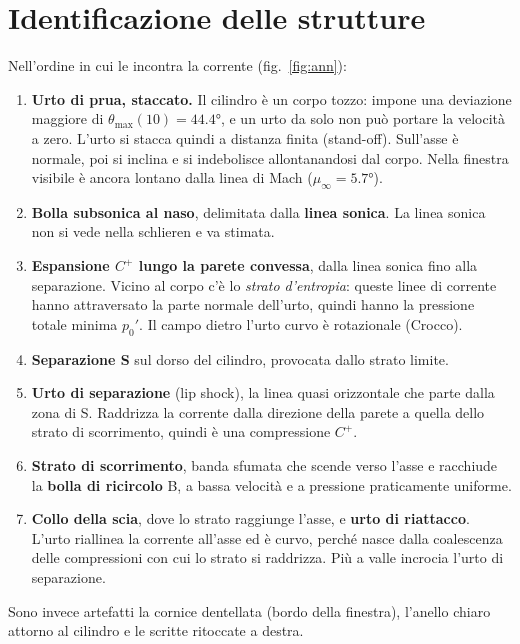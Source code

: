 \documentclass[11pt,a4paper]{article}
\newcommand{\Cp}{C^{+}}
\begin{document}
\section{Identificazione delle strutture}
Nell'ordine in cui le incontra la corrente (fig.~\ref{fig:ann}):
\begin{enumerate}
\item \textbf{Urto di prua, staccato.} Il cilindro è un corpo tozzo: impone una deviazione maggiore di
  $\theta_{\max}(10)=\ang{44.4}$, e un urto da solo non può portare la velocità a zero. L'urto si stacca
  quindi a distanza finita (stand-off). Sull'asse è normale, poi si inclina e si indebolisce allontanandosi
  dal corpo. Nella finestra visibile è ancora lontano dalla linea di Mach ($\mu_\infty=\ang{5.7}$).
\item \textbf{Bolla subsonica al naso}, delimitata dalla \textbf{linea sonica}. La linea sonica non si
  vede nella schlieren e va stimata.
\item \textbf{Espansione $\Cp$ lungo la parete convessa}, dalla linea sonica fino alla separazione.
  Vicino al corpo c'è lo \emph{strato d'entropia}: queste linee di corrente hanno attraversato la parte
  normale dell'urto, quindi hanno la pressione totale minima $p_0'$. Il campo dietro l'urto curvo è rotazionale (Crocco).
\item \textbf{Separazione S} sul dorso del cilindro, provocata dallo strato limite.
\item \textbf{Urto di separazione} (lip shock), la linea quasi orizzontale che parte dalla zona di S.
  Raddrizza la corrente dalla direzione della parete a quella dello strato di scorrimento, quindi è una compressione $\Cp$.
\item \textbf{Strato di scorrimento}, banda sfumata che scende verso l'asse e racchiude la \textbf{bolla di
  ricircolo} B, a bassa velocità e a pressione praticamente uniforme.
\item \textbf{Collo della scia}, dove lo strato raggiunge l'asse, e \textbf{urto di riattacco}. L'urto riallinea
  la corrente all'asse ed è curvo, perché nasce dalla coalescenza delle compressioni con cui lo strato si raddrizza.
  Più a valle incrocia l'urto di separazione.
\end{enumerate}
Sono invece artefatti la cornice dentellata (bordo della finestra), l'anello chiaro attorno al cilindro e
le scritte ritoccate a destra.

\end{document}

